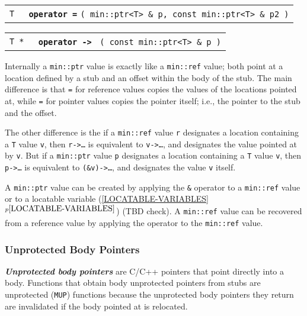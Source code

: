\documentclass[12pt]{article}
\makeatletter
\newcommand{\ikey}[2]{{\bf \em #1}\index{#2}}
\newcommand{\ttomkey}[3]{{\tt \bf operator #2}%
                         \index{#1@{\tt operator #2}!{#3}}}
\newcommand{\itemref}[1]{\ref{#1}$^{p\pageref{#1}}$}
\newcommand{\EOL}{\penalty \exhyphenpenalty}
\newcommand{\GT}{{\tt >}}
\newenvironment{indpar}[1][0.3in]%
	{\begin{list}{}%
		     {\setlength{\itemsep}{0in}%
		      \setlength{\topsep}{0in}%
		      \setlength{\parsep}{1ex}%
		      \setlength{\labelwidth}{#1}%
		      \setlength{\leftmargin}{#1}%
		      \addtolength{\leftmargin}{\labelsep}}%
	 \item}%
	{\end{list}}
\newcommand{\LABEL}[1]{\label{#1}}
\newcommand{\TTOMKEY}[2]{\ttomkey{#1}{#2}}
\makeatother
\begin{document}
\begin{indpar}\begin{tabular}{r@{}l}
\verb|T |
    & \TTOMKEY{=}{=}{of {\tt min::ref\TARG}}
      \verb|( min::ptr<T> & p, const min::ptr<T> & p2 )|
\LABEL{MIN::=PTR_OF_PTR}
\end{tabular}\end{indpar}

\begin{indpar}\begin{tabular}{r@{}l}
\verb|T * |
	& \TTOMKEY{-\GT}{-\GT}%
	          {of {\tt min::ptr\TARG}}
	  \verb| ( const min::ptr<T> & p )|
\LABEL{MIN::PTR_->} \\
\end{tabular}\end{indpar}

Internally a {\tt min::\EOL ptr\TARG} value is exactly like a
{\tt min::\EOL ref\TARG} value; both point at a location defined by
a stub and an offset within the body of the stub.
The main difference is that {\tt =} for reference values copies the
values of the locations pointed at, while {\tt =} for pointer values
copies the pointer itself; i.e., the pointer to the stub and the offset.

The other difference is the if a {\tt min::\EOL ref\TARG} value {\tt r}
designates a location containing a {\tt T} value {\tt v}, then
{\tt r->\ldots} is equivalent to {\tt v->\ldots}, and designates the value
pointed at by {\tt v}. 
But if a {\tt min::\EOL ptr\TARG} value {\tt p}
designates a location containing a {\tt T} value {\tt v}, then
{\tt p->\ldots} is equivalent to {\tt (\&v)->\ldots},
and designates the value {\tt v} itself.

A {\tt min::\EOL ptr\TARG} value can be created by applying the
{\tt \&} operator to a {\tt min::\EOL ref\TARG} value or to a
locatable variable (\itemref{LOCATABLE-VARIABLES}) (TBD check).
A {\tt min::\EOL ref\TARG} value can be recovered from a
reference value by applying the
{\tt *} operator to the {\tt min::\EOL ref\TARG} value.


\subsubsection{Unprotected Body Pointers}
\label{UNPROTECTED-BODY-POINTERS}

\ikey{Unprotected body pointers}{unprotected body pointer}%
are C/C++ pointers that point directly into a body.
Functions that obtain body unprotected
pointers from stubs are unprotected (\verb|MUP|) functions because
the unprotected body pointers they return are invalidated
if the body pointed at
is relocated.
\end{document}
